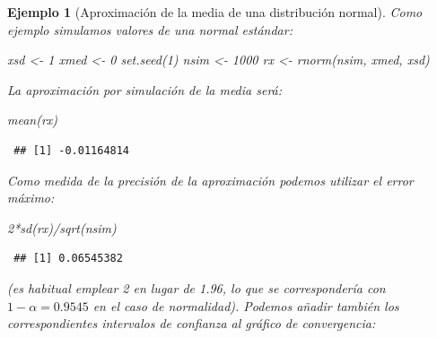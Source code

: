 \documentclass[
]{book}
\newenvironment{Shaded}{\begin{snugshade}}{\end{snugshade}}
\newcommand{\DecValTok}[1]{\textcolor[rgb]{0.00,0.00,0.81}{#1}}
\newcommand{\FunctionTok}[1]{\textcolor[rgb]{0.00,0.00,0.00}{#1}}
\newcommand{\NormalTok}[1]{#1}
\newcommand{\OtherTok}[1]{\textcolor[rgb]{0.56,0.35,0.01}{#1}}
\newcommand{\SpecialCharTok}[1]{\textcolor[rgb]{0.00,0.00,0.00}{#1}}
\theoremstyle{break}
\newtheorem{example}{Ejemplo}[chapter]
\theoremstyle{nonumberplain}
\begin{document}
\begin{example}[Aproximación de la media de una distribución normal]

Como ejemplo simulamos valores de una normal estándar:

\begin{Shaded}
\begin{Highlighting}[]
\NormalTok{xsd }\OtherTok{\textless{}{-}} \DecValTok{1}
\NormalTok{xmed }\OtherTok{\textless{}{-}} \DecValTok{0}
\FunctionTok{set.seed}\NormalTok{(}\DecValTok{1}\NormalTok{)}
\NormalTok{nsim }\OtherTok{\textless{}{-}} \DecValTok{1000}
\NormalTok{rx }\OtherTok{\textless{}{-}} \FunctionTok{rnorm}\NormalTok{(nsim, xmed, xsd)}
\end{Highlighting}
\end{Shaded}

La aproximación por simulación de la media será:

\begin{Shaded}
\begin{Highlighting}[]
\FunctionTok{mean}\NormalTok{(rx)}
\end{Highlighting}
\end{Shaded}

\begin{verbatim}
 ## [1] -0.01164814
\end{verbatim}

Como medida de la precisión de la aproximación podemos utilizar el error máximo:

\begin{Shaded}
\begin{Highlighting}[]
\DecValTok{2}\SpecialCharTok{*}\FunctionTok{sd}\NormalTok{(rx)}\SpecialCharTok{/}\FunctionTok{sqrt}\NormalTok{(nsim)}
\end{Highlighting}
\end{Shaded}

\begin{verbatim}
 ## [1] 0.06545382
\end{verbatim}

(es habitual emplear 2 en lugar de 1.96,
lo que se correspondería con \(1 - \alpha = 0.9545\) en el caso de normalidad).
Podemos añadir también los correspondientes intervalos de confianza al gráfico de convergencia:


\end{example}
\end{document}
